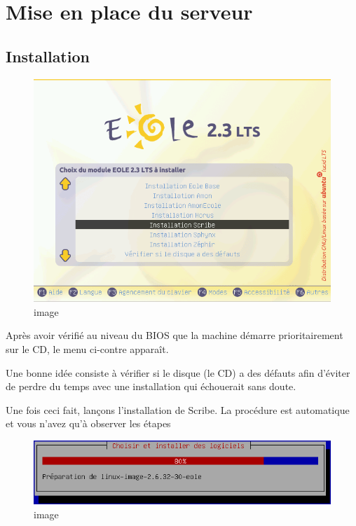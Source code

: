 \documentclass{article}
\makeatletter
\def\maxwidth{\ifdim\Gin@nat@width>\linewidth\linewidth
\else\Gin@nat@width\fi}
\let\Oldincludegraphics\includegraphics
\renewcommand{\includegraphics}[1]{\Oldincludegraphics[width=\maxwidth]{#1}}
\makeatother
\begin{document}
\section{Mise en place du serveur}

\subsection{Installation}

\begin{figure}[htbp]
\centering
\includegraphics{scribe_html_m1451a7db.png}
\caption{image}
\end{figure}

Après avoir vérifié au niveau du BIOS que la machine démarre
prioritairement sur le CD, le menu ci-contre apparaît.

Une bonne idée consiste à vérifier si le disque (le CD) a des défauts
afin d'éviter de perdre du temps avec une installation qui échouerait
sans doute.

Une fois ceci fait, lançons l'installation de Scribe. La procédure est
automatique et vous n'avez qu'à observer les étapes

\begin{figure}[htbp]
\centering
\includegraphics{scribe_html_4b5e166b.png}
\caption{image}
\end{figure}
\end{document}
